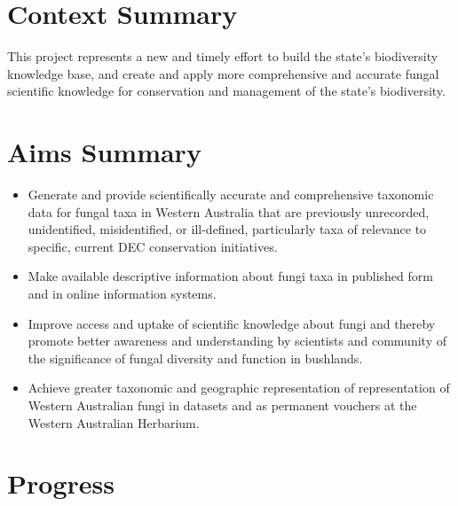 \documentclass[version=last, paper=a4, DIV=18, usenames, dvipsnames]{scrartcl}
\begin{document}
\section{Context Summary}



This project represents a new and timely effort to build the state's biodiversity knowledge base, and create and apply more comprehensive and accurate fungal scientific knowledge for conservation and management of the state's biodiversity.






\section{Aims Summary}



\begin{itemize}

  \item Generate and provide scientifically accurate and comprehensive taxonomic data for fungal taxa in Western Australia that are previously unrecorded, unidentified, misidentified, or ill-defined, particularly taxa of relevance to specific, current DEC conservation initiatives.

  \item Make available descriptive information about fungi taxa in published form and in online information systems.

  \item Improve access and uptake of scientific knowledge about fungi and thereby promote better awareness and understanding by scientists and community of the significance of fungal diversity and function in bushlands.

  \item Achieve greater taxonomic and geographic representation of representation of Western Australian fungi in datasets and as permanent vouchers at the Western Australian Herbarium.

\end{itemize}






\section{Progress}
\end{document}
